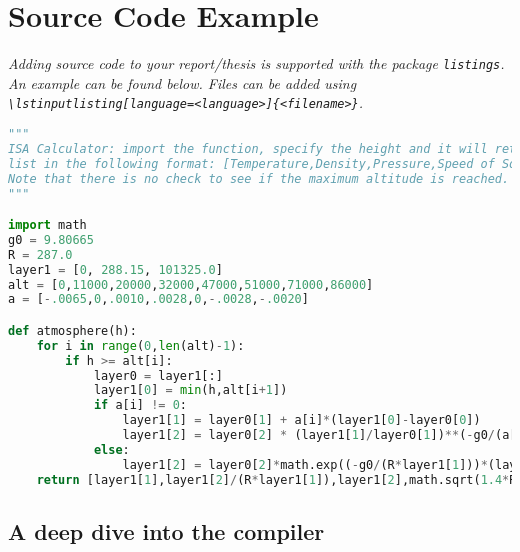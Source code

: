\chapter{Source Code Example}

\emph{Adding source code to your report/thesis is supported with the package {\normalfont\texttt{listings}}. An example can be found below. Files can be added using {\normalfont\texttt{\textbackslash lstinputlisting[language=<language>]\{<filename>\}}}.}

\begin{lstlisting}[language=Python]
"""
ISA Calculator: import the function, specify the height and it will return a
list in the following format: [Temperature,Density,Pressure,Speed of Sound].
Note that there is no check to see if the maximum altitude is reached.
"""

import math
g0 = 9.80665
R = 287.0
layer1 = [0, 288.15, 101325.0]
alt = [0,11000,20000,32000,47000,51000,71000,86000]
a = [-.0065,0,.0010,.0028,0,-.0028,-.0020]

def atmosphere(h):
    for i in range(0,len(alt)-1):
        if h >= alt[i]:
            layer0 = layer1[:]
            layer1[0] = min(h,alt[i+1])
            if a[i] != 0:
                layer1[1] = layer0[1] + a[i]*(layer1[0]-layer0[0])
                layer1[2] = layer0[2] * (layer1[1]/layer0[1])**(-g0/(a[i]*R))
            else:
                layer1[2] = layer0[2]*math.exp((-g0/(R*layer1[1]))*(layer1[0]-layer0[0]))
    return [layer1[1],layer1[2]/(R*layer1[1]),layer1[2],math.sqrt(1.4*R*layer1[1])]
\end{lstlisting}

\section{A deep dive into the compiler}


